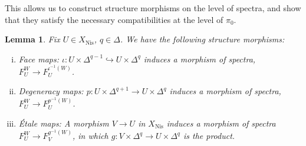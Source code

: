 \documentclass[11pt, twoside]{article}
\numberwithin{equation}{section}
\newtheorem{lemma}[equation]{Lemma}
\theoremstyle{definition}
\newcommand{\nis}{\mathrm{Nis}}
\begin{document}
This allows us to construct structure morphisms on the level of spectra, and show that they satisfy the necessary compatibilities at the level of \(\pi_0\).

\begin{lemma}\label{lemm:senh-struc}
Fix \(U \in X_\nis\), \(q \in \Delta\). We have the following structure morphisms: 
\begin{enumerate}[i).]

\item Face maps: \(\iota \colon U \times \Delta^{q - 1} \hookrightarrow U \times \Delta^q\) induces a morphism of spectra, \(F_U^W \to F_U^{\iota^{- 1}(W)}\).

\item Degeneracy maps: \(p \colon U \times \Delta^{q + 1} \to U \times \Delta^q\) induces a morphism of spectra, \(F_U^W \to F_U^{p^{- 1}(W)}\).

\item Étale maps: A morphism \(V \to U\) in \(X_\nis\) induces a morphism of spectra \(F_U^W \to F_V^{g^{- 1}(W)}\), in which \(g \colon V \times \Delta^q \to U \times \Delta^q\) is the product.

\end{enumerate}
\end{lemma}
\end{document}
